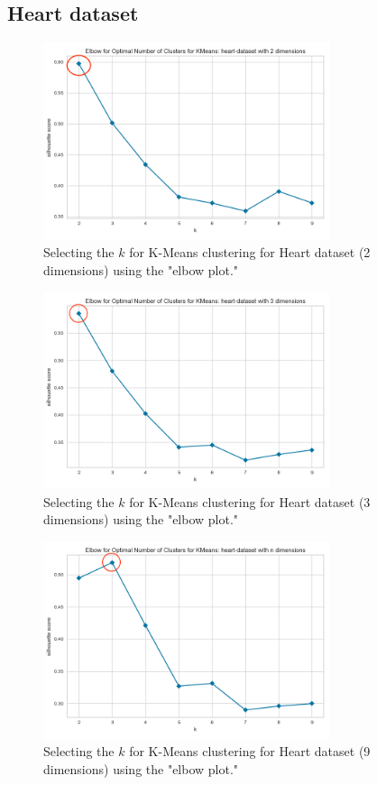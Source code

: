 \subsection{Heart dataset}
\begin{figure}[H]
  \includegraphics[width=0.75\textwidth]{Appendix//parameter-selection/heart-dataset-2-kmeans.png}
  \caption{Selecting the $k$ for K-Means clustering for Heart dataset (2 dimensions) using the "elbow plot."}
  \label{hyperparameters:agglomerative-heart-dataset-2d}
\end{figure}
\begin{figure}[H]
  \includegraphics[width=0.75\textwidth]{Appendix//parameter-selection/heart-dataset-3-kmeans.png}
  \caption{Selecting the $k$ for K-Means clustering for Heart dataset (3 dimensions) using the "elbow plot."}
  \label{hyperparameters:agglomerative-heart-dataset-3d}
\end{figure}
\begin{figure}[H]
  \includegraphics[width=0.75\textwidth]{Appendix//parameter-selection/heart-dataset-n-kmeans.png}
  \caption{Selecting the $k$ for K-Means clustering for Heart dataset (9 dimensions) using the "elbow plot."}
  \label{hyperparameters:agglomerative-heart-dataset-9d}
\end{figure}
\newpage


